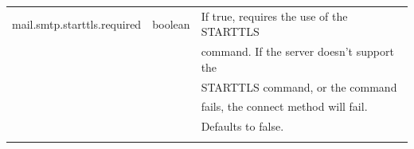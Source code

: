 \documentclass[envcountsame,envcountchap]{svmono}
\begin{document}
\begin{table}
\begin{tabular}{lll}
mail.smtp.starttls.required & boolean & If true, requires the use of the STARTTLS \\ & & command. If the server doesn't support the \\ & & STARTTLS command, or the command \\ & & fails, the connect method will fail. \\ & &Defaults to false. \\
\noalign{\smallskip}\hline
\end{tabular}
\end{table}

\backmatter

\printindex

\begin{thebibliography}{99.}
\end{thebibliography}
\end{document}
